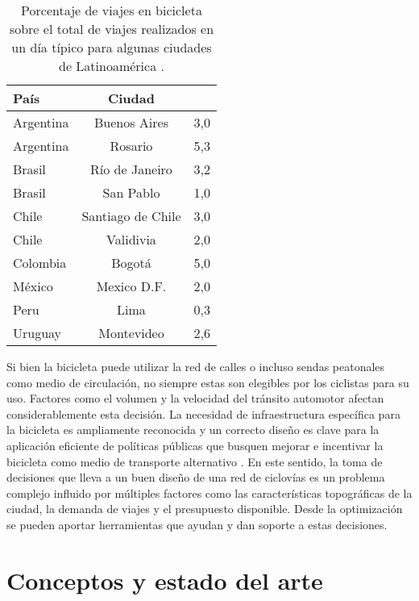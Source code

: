   \begin{table}[h!]
    \centering
      \begin{tabular}{lcS}
      \toprule
      País & Ciudad &  \\
      \midrule
        Argentina & Buenos Aires & 3,0 \\
        Argentina & Rosario & 5,3 \\
        Brasil & Río de Janeiro & 3,2 \\
        Brasil & San Pablo & 1,0 \\
        Chile & Santiago de Chile & 3,0 \\
        Chile & Validivia & 2,0 \\
        Colombia & Bogotá & 5,0 \\
        México & Mexico D.F. & 2,0 \\
        Peru & Lima & 0,3 \\
        Uruguay & Montevideo & 2,6 \\
      \bottomrule
    \end{tabular}
      \caption{Porcentaje de viajes en bicicleta sobre el total de viajes realizados en un día típico para algunas ciudades de Latinoamérica \parencite{rios2015}.}
      \label{table:bicycleusagelatinamerica}
  \end{table}

  Si bien la bicicleta puede utilizar la red de calles o incluso sendas peatonales como medio de circulación, no siempre estas son elegibles por los ciclistas para su uso. Factores como el volumen y la velocidad del tránsito automotor afectan considerablemente esta decisión. La necesidad de infraestructura específica para la bicicleta es ampliamente reconocida y un correcto diseño es clave para la aplicación eficiente de políticas públicas que busquen mejorar e incentivar la bicicleta como medio de transporte alternativo \parencite{Hunt2007}. En este sentido, la toma de decisiones que lleva a un buen diseño de una red de ciclovías es un problema complejo influido por múltiples factores como las características topográficas de la ciudad, la demanda de viajes y el presupuesto disponible. Desde la optimización se pueden aportar herramientas que ayudan y dan soporte a estas decisiones.

  \section{Conceptos y estado del arte}

